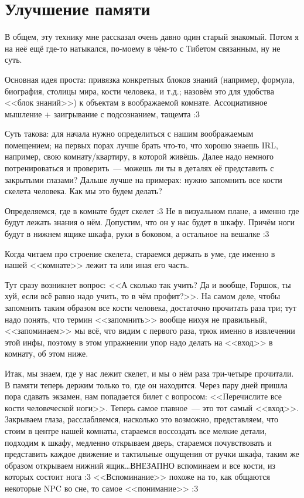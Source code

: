 \documentclass[a4paper,14pt,oneside]{memoir}
\begin{document}
\chapter{Улучшение памяти}
В общем, эту технику мне рассказал очень давно один старый знакомый. Потом я на неё ещё где-то натыкался, по-моему в чём-то с Тибетом связанным, ну не суть.
 
Основная идея проста: привязка конкретных блоков знаний (например, формула, биография, столицы мира, кости человека, и т.д.; назовём это для удобства <<блок знаний>>) к объектам в воображаемой комнате. Ассоциативное мышление + заигрывание с подсознанием, тащемта :3
 
Суть такова: для начала нужно определиться с нашим воображаемым помещением; на первых порах лучше брать что-то, что хорошо знаешь IRL, например, свою комнату/квартиру, в которой живёшь. Далее надо немного потренироваться и проверить~--- можешь ли ты в деталях её представить с закрытыми глазами? Дальше лучше на примерах: нужно запомнить все кости скелета человека. Как мы это будем делать?

Определяемся, где в комнате будет скелет :3 Не в визуальном плане, а именно где будут лежать знания о нём. Допустим, что он у нас будет в шкафу. Причём ноги будут в нижнем ящике шкафа, руки в боковом, а остальное на вешалке :3 

Когда читаем про строение скелета, стараемся держать в уме, где именно в нашей <<комнате>> лежит та или иная его часть.
 
Тут сразу возникнет вопрос: <<А сколько так учить? Да и вообще, Горшок, ты хуй, если всё равно надо учить, то в чём профит?>>. На самом деле, чтобы запомнить таким образом все кости человека, достаточно прочитать раза три; тут надо понять, что термин <<запомнить>> вообще нихуя не правильный, <<запоминаем>> мы всё, что видим с первого раза, трюк именно в извлечении этой инфы, поэтому в этом упражнении упор надо делать на <<вход>> в комнату, об этом ниже. 

Итак, мы знаем, где у нас лежит скелет, и мы о нём раза три-четыре прочитали. В памяти теперь держим только то, где он находится. Через пару дней пришла пора сдавать экзамен, нам попадается билет с вопросом: <<Перечислите все кости человеческой ноги>>. Теперь самое главное~--- это тот самый <<вход>>. Закрываем глаза, расслабляемся, насколько это возможно, представляем, что стоим в центре нашей комнаты, стараемся воссоздать все мелкие детали, подходим к шкафу, медленно открываем дверь, стараемся почувствовать и представить каждое движение и тактильные ощущения от ручки шкафа, таким же образом открываем нижний ящик\ldots ВНЕЗАПНО вспоминаем и все кости, из которых состоит нога :3 <<Вспоминание>> похоже на то, как общаются некоторые NPC во сне, то самое <<понимание>> :3
 
\end{document}
